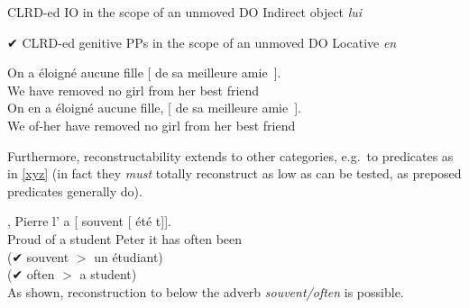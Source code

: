 \documentclass[output=paper]{langsci/langscibook}
\begin{document}
\begin{exe}
    \ex * CLRD-ed IO in the scope of an unmoved DO \hfill{Indirect object  {\it lui}}
    \begin{xlist}
    \end{xlist}
    \ex ✔ \gls{CLRD}-ed genitive
PPs in the scope of an unmoved DO \hfill{Locative {\it en}}
    \begin{xlist}
    \ex
	\gll      On     a   \'{e}loign\'{e}  aucune fille [ de
    sa   meilleure amie~].\\
    We   have   removed   no girl {}  from her   best        friend\\
    \ex
    \gll On  en   a   \'{e}loign\'{e}  aucune fille, [ de sa   meilleure amie~].\\
    We   of-her have   removed   no girl {} from her   best        friend  \\
    \end{xlist}
\end{exe}
%
Furthermore, reconstructability extends to other categories, e.g.\ to
predicates as in \eqref{xyz} (in fact they {\it must} totally reconstruct as low
as can be tested, as preposed predicates generally do).

\ea \label{xyz}
,    Pierre
l' a     [ souvent [ \'{e}t\'{e} t]].\\
{}  Proud of a student      Peter  it has  {} often {} been	{}\\
\sn \gll
    (✔ souvent $>$ un \'{e}tudiant)\\
    (✔ often $>$ a student)\\
\z
%
As shown, reconstruction to below the adverb {\it souvent/often} is possible.
\end{document}

